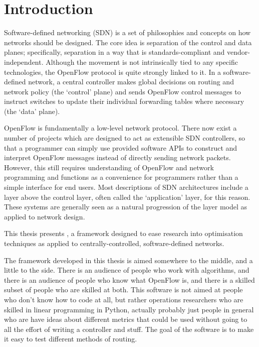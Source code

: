 \chapter{Introduction}
\label{ch:intro}

Software-defined networking (SDN) is a set of philosophies and concepts on how networks should be designed. The core idea is separation of the control and data planes; specifically, separation in a way that is standards-compliant and vendor-independent. Although the movement is not intrinsically tied to any specific technologies, the OpenFlow protocol is quite strongly linked to it. In a software-defined network, a central controller makes global decisions on routing and network policy (the `control' plane) and sends OpenFlow control messages to instruct switches to update their individual forwarding tables where necessary (the `data' plane).

OpenFlow is fundamentally a low-level network protocol. There now exist a number of projects which are designed to act as extensible SDN controllers, so that a programmer can simply use provided software APIs to construct and interpret OpenFlow messages instead of directly sending network packets. However, this still requires understanding of OpenFlow and network programming and functions as a convenience for programmers rather than a simple interface for end users.  Most descriptions of SDN architectures include a layer above the control layer, often called the `application' layer, for this reason. These systems are generally seen as a natural progression of the layer model as applied to network design.

This thesis presents \thesis{}, a framework designed to ease research into optimisation techniques as applied to centrally-controlled, software-defined networks. 











The framework developed in this thesis is aimed somewhere to the middle, and a little to the side. There is an audience of people who work with algorithms, and there is an audience of people who know what OpenFlow is, and there is a skilled subset of people who are skilled at both. This software is not aimed at people who don't know how to code at all, but rather operations researchers who are skilled in linear programming in Python, actually probably just people in general who are have ideas about different metrics that could be used without going to all the effort of writing a controller and stuff. The goal of the software is to make it easy to test different methods of routing. 


